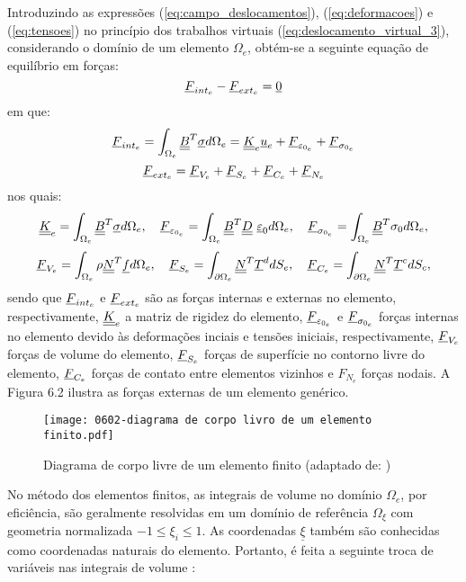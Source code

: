 Introduzindo as expressões (\ref{eq:campo_deslocamentos}), (\ref{eq:deformacoes}) e (\ref{eq:tensoes}) no princípio dos trabalhos virtuais (\ref{eq:deslocamento_virtual_3}), considerando o domínio de um elemento $\Omega_e$, obtém-se a seguinte equação de equilíbrio em forças:
\begin{equation}
	\label{eq:forcas_interna_externa}
	\underline{F}_{int_e} - \underline{F}_{ext_e} = \underline 0
\end{equation}
em que:
\begin{equation}
	\label{eq:forca_interna}
	\underline{F}_{int_e} = \int_{\Omega_e} \underline{\underline B}^T \underline \sigma d\Omega_e = \underline{\underline K}_e \underline u_e + \underline{F}_{\varepsilon_{0_e}} + \underline{F}_{\sigma_{0_e}}
\end{equation}
\begin{equation}
	\label{eq:forca_externa}
	\underline{F}_{ext_e} = \underline{F}_{V_e} + \underline{F}_{S_e} + \underline{F}_{C_e} + \underline{F}_{N_e}
\end{equation}
nos quais:
\begin{equation}
	\label{eq:elementos_forca_interna}
	\underline{\underline K}_e = \int_{\Omega_e} \underline{\underline B}^T \underline \sigma d\Omega_e,~~~ \underline{F}_{\varepsilon_{0_e}} = \int_{\Omega_e} \underline{\underline B}^T \underline{\underline D}~ \underline{\varepsilon}_0 d\Omega_e,~~~ \underline{F}_{\sigma_{0_e}} = \int_{\Omega_e} \underline{\underline B}^T \sigma_0 d\Omega_e,
\end{equation}
\begin{equation}
	\label{eq:elementos_forca_externa}
	\underline{F}_{V_e} = \int_{\Omega_e} \rho \underline{\underline N}^T \underline f d\Omega_e,~~~ \underline{F}_{S_e} = \int_{\partial \Omega_e} \underline{\underline N}^T \underline T^d dS_e,~~~
	\underline{F}_{C_e} = \int_{\partial \Omega_{e}} \underline{\underline N}^T \underline T^c dS_c,
\end{equation}
sendo que $\underline{F}_{int_e}$ e $\underline{F}_{ext_e}$ são as forças internas e externas no elemento, respectivamente, $\underline{\underline K}_e$ a matriz de rigidez do elemento, $\underline{F}_{\varepsilon_{0_e}}$ e $\underline{F}_{\sigma_{0_e}}$  forças internas no elemento devido às deformações inciais e tensões iniciais, respectivamente, $\underline{F}_{V_e}$ forças de volume do elemento, $\underline{F}_{S_e}$ forças de superfície no contorno livre do elemento, $\underline{F}_{C_e}$ forças de contato entre elementos vizinhos e $F_{N_e}$  forças nodais. A Figura 6.2 ilustra as forças externas de um elemento genérico.
\begin{figure}[H]
	\begin{center}
		\texttt{[image: 0602-diagrama de corpo livro de um elemento finito.pdf]}
	\end{center}
	\caption{\label{discretizacao_MEF}Diagrama de corpo livre de um elemento finito (adaptado de: )}
\end{figure}
No método dos elementos finitos, as integrais de volume no domínio  $\Omega_e$, por eficiência, são geralmente resolvidas em um domínio de referência $\Omega_\xi$ com geometria normalizada $-1 \le \xi_i \le 1$. As coordenadas $\underline \xi$ também são conhecidas como coordenadas naturais do elemento. Portanto, é feita a seguinte troca de variáveis nas integrais de volume \cite[p. 147]{Zienkiewicz2005}:
